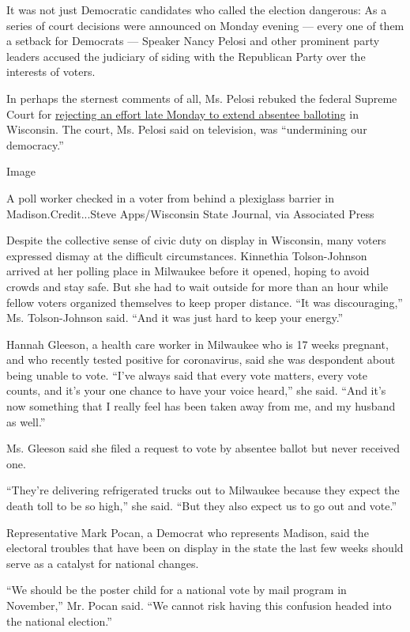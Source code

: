 It was not just Democratic candidates who called the election dangerous:
As a series of court decisions were announced on Monday evening ---
every one of them a setback for Democrats --- Speaker Nancy Pelosi and
other prominent party leaders accused the judiciary of siding with the
Republican Party over the interests of voters.

In perhaps the sternest comments of all, Ms. Pelosi rebuked the federal
Supreme Court for
\href{https://www.nytimes3xbfgragh.onion/2020/04/07/us/politics/wisconsin-elections-supreme-court.html}{rejecting
an effort late Monday to extend absentee balloting} in Wisconsin. The
court, Ms. Pelosi said on television, was ``undermining our democracy.''

Image

A poll worker checked in a voter from behind a plexiglass barrier in
Madison.Credit...Steve Apps/Wisconsin State Journal, via Associated
Press

Despite the collective sense of civic duty on display in Wisconsin, many
voters expressed dismay at the difficult circumstances. Kinnethia
Tolson-Johnson arrived at her polling place in Milwaukee before it
opened, hoping to avoid crowds and stay safe. But she had to wait
outside for more than an hour while fellow voters organized themselves
to keep proper distance. ``It was discouraging,'' Ms. Tolson-Johnson
said. ``And it was just hard to keep your energy.''

Hannah Gleeson, a health care worker in Milwaukee who is 17 weeks
pregnant, and who recently tested positive for coronavirus, said she was
despondent about being unable to vote. ``I've always said that every
vote matters, every vote counts, and it's your one chance to have your
voice heard,'' she said. ``And it's now something that I really feel has
been taken away from me, and my husband as well.''

Ms. Gleeson said she filed a request to vote by absentee ballot but
never received one.

``They're delivering refrigerated trucks out to Milwaukee because they
expect the death toll to be so high,'' she said. ``But they also expect
us to go out and vote.''

Representative Mark Pocan, a Democrat who represents Madison, said the
electoral troubles that have been on display in the state the last few
weeks should serve as a catalyst for national changes.

``We should be the poster child for a national vote by mail program in
November,'' Mr. Pocan said. ``We cannot risk having this confusion
headed into the national election.''

